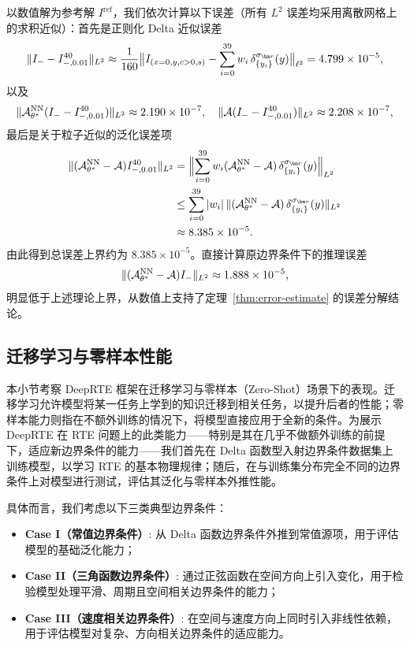 以数值解为参考解 $I^{\text{ref}}$，我们依次计算以下误差（所有 $L^2$ 误差均采用离散网格上的求积近似）：首先是正则化 Delta 近似误差
\begin{equation}
    \|I_{-} - I^{40}_{-,0.01}\|_{L^2} \approx \frac{1}{160}\bigl\|I_{(x=0,y,c>0,s)} - \sum_{i=0}^{39} w_{i} \,\delta^{\sigma_{\br}}_{\{y_i\}}(y)\bigr\|_{\ell^2}=4.799\times 10^{-5},
\end{equation}
以及
\begin{equation}
    \|\mathcal{A}^{\text{NN}}_{\theta^*}(I_{-} - I^{40}_{-,0.01})\|_{L^2}\approx 2.190\times 10^{-7}, \quad
    \|\mathcal{A}(I_{-} - I^{40}_{-,0.01})\|_{L^2} \approx 2.208\times 10^{-7},
\end{equation}
最后是关于粒子近似的泛化误差项
\begin{equation}
    \begin{aligned}
        \|(\ANN_{\theta^*} - \mathcal{A}) I^{40}_{-,0.01}\|_{L^2}
         & = \Bigl\|\sum_{i=0}^{39} w_i(\ANN_{\theta^*} - \mathcal{A})
        \,\delta^{\sigma_{\br}}_{\{y_i\}}(y)\Bigr\|_{L^2}              \\
         & \leq \sum_{i=0}^{39} |w_i|\,
        \|(\ANN_{\theta^*} - \mathcal{A})
        \,\delta^{\sigma_{\br}}_{\{y_i\}}(y)\|_{L^2}                   \\
         & \approx 8.385\times 10^{-5}.
    \end{aligned}
\end{equation}
由此得到总误差上界约为 $8.385\times 10^{-5}$。直接计算原边界条件下的推理误差
\begin{equation}
    \|(\mathcal{A}^{\text{NN}}_{\theta^*} - \mathcal{A}) I_{-}\|_{L^2} \approx 1.888\times 10^{-5},
\end{equation}
明显低于上述理论上界，从数值上支持了定理~\ref{thm:error-estimate} 的误差分解结论。

\subsection{迁移学习与零样本性能}

本小节考察 DeepRTE 框架在迁移学习与零样本（Zero-Shot）场景下的表现。迁移学习允许模型将某一任务上学到的知识迁移到相关任务，以提升后者的性能；零样本能力则指在不额外训练的情况下，将模型直接应用于全新的条件。为展示 DeepRTE 在 RTE 问题上的此类能力——特别是其在几乎不做额外训练的前提下，适应新边界条件的能力——我们首先在 Delta 函数型入射边界条件数据集上训练模型，以学习 RTE 的基本物理规律；随后，在与训练集分布完全不同的边界条件上对模型进行测试，评估其泛化与零样本外推性能。

具体而言，我们考虑以下三类典型边界条件：
\begin{itemize}
    \item \textbf{Case I（常值边界条件）}: 从 Delta 函数边界条件外推到常值源项，用于评估模型的基础泛化能力；
    \item \textbf{Case II（三角函数边界条件）}: 通过正弦函数在空间方向上引入变化，用于检验模型处理平滑、周期且空间相关边界条件的能力；
    \item \textbf{Case III（速度相关边界条件）}: 在空间与速度方向上同时引入非线性依赖，用于评估模型对复杂、方向相关边界条件的适应能力。
\end{itemize}

